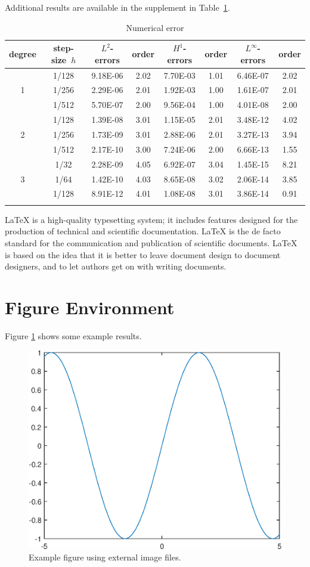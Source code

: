 \documentclass[openany,twoside,12pt]{book}
\theoremstyle{plain}
\numberwithin{equation}{chapter}
\numberwithin{figure}{chapter}
\numberwithin{table}{chapter}
\begin{document}
Additional results are available in the supplement in Table~\ref{tab:error}.

\begin{table}[htp!]
\centering
\setlength{\tabcolsep}{8pt}
\renewcommand\arraystretch{1.2}
\caption{Numerical error}
\label{tab:error}
\begin{tabular}{c|c|cc|cc|cc}
\Xhline{2\arrayrulewidth}
degree & step-size~$h$ & $L^2$-errors & order & $H^1$-errors & order & $L^\infty$-errors & order \\
\hline
\multirow{3}{*}{1}
  & 1/128 & 9.18E-06 & 2.02 & 7.70E-03 & 1.01 & 6.46E-07 & 2.02 \\
  & 1/256 & 2.29E-06 & 2.01 & 1.92E-03 & 1.00 & 1.61E-07 & 2.01 \\
  & 1/512 & 5.70E-07 & 2.00 & 9.56E-04 & 1.00 & 4.01E-08 & 2.00 \\
\hline  %
\multirow{3}{*}{2}
  & 1/128 & 1.39E-08 & 3.01 & 1.15E-05 & 2.01 & 3.48E-12 & 4.02 \\
  & 1/256 & 1.73E-09 & 3.01 & 2.88E-06 & 2.01 & 3.27E-13 & 3.94 \\
  & 1/512 & 2.17E-10 & 3.00 & 7.24E-06 & 2.00 & 6.66E-13 & 1.55 \\
\hline  %
\multirow{3}{*}{3}
  & 1/32  & 2.28E-09 & 4.05 & 6.92E-07 & 3.04 & 1.45E-15 & 8.21 \\
  & 1/64  & 1.42E-10 & 4.03 & 8.65E-08 & 3.02 & 2.06E-14 & 3.85 \\
  & 1/128 & 8.91E-12 & 4.01 & 1.08E-08 & 3.01 & 3.86E-14 & 0.91 \\
\Xhline{2\arrayrulewidth}
\end{tabular}
\end{table}

LaTeX is a high-quality typesetting system; it includes features designed
for the production of technical and scientific documentation.
LaTeX is the de facto standard for the communication and publication of scientific documents.
LaTeX is based on the idea that it is better to leave document design to
document designers, and to let authors get on with writing documents.


\clearpage
\section{Figure Environment}

Figure \ref{fig:sinx} shows some example results.
\begin{figure}[htp!]
  \centering
  \includegraphics[width=0.48\linewidth]{image1}
  \caption{Example figure using external image files.}
  \label{fig:sinx}
\end{figure}
\end{document}
